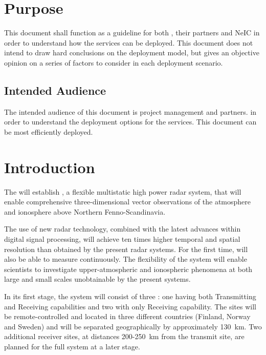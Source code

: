 \documentclass[12pt,a4paper]{article}
\begin{document}
\section{Purpose}
\label{purpose}

This document shall function as a guideline for both \EC, their partners and NeIC in order to understand how the \ED \einfra services can be deployed.
This document does not intend to draw hard conclusions on the deployment model, but gives an objective opinion on a series of factors to consider in each deployment scenario.

\subsection{Intended Audience}
\label{ssec:audiance}

The intended audience of this document is \ED project management and \EC partners.
in order to understand the deployment options for the \ED \einfra services.
This document can be
most efficiently deployed.

\section{Introduction}
\label{intro}

The \ESA will establish \ED, a flexible multistatic high power radar system, that will enable comprehensive three-dimensional vector observations of the atmosphere and ionosphere above Northern Fenno-Scandinavia.  

The use of new radar technology, combined with the latest advances within digital signal processing,
will achieve ten times higher temporal and spatial resolution than
obtained by the present \EC radar systems. 
For the first time, \EC will also be able to measure continuously.  
The flexibility of the \ED system will enable scientists to investigate upper-atmospheric and 
ionospheric phenomena at both large and small scales unobtainable by the present systems.

In its first stage, the \ED system will consist of three \RSs:
one having both 
{T}ransmitting  and {R}eceiving 
capabilities and two with only Receiving capability.  
The sites will
be remote-controlled and located in three different countries (Finland,
Norway and Sweden) and will be separated geographically by
approximately 130~km.  
Two additional receiver sites, at distances 200-250~km from the transmit site, 
are planned for the full \ED system at a later stage.
\end{document}
